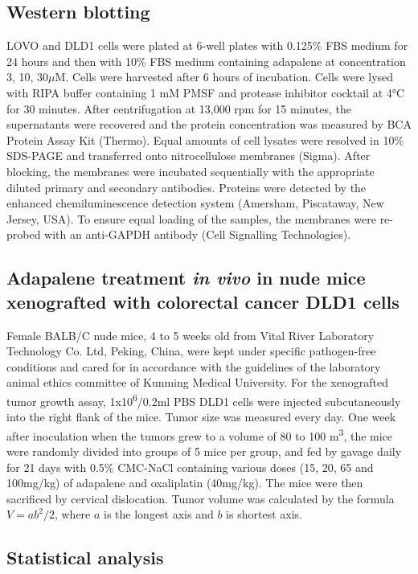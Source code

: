\subsection{Western blotting}

LOVO and DLD1 cells were plated at 6-well plates with 0.125\% FBS medium for 24 hours and then with 10\% FBS medium containing adapalene at concentration 3, 10, 30$\mu$M. Cells were harvested after 6 hours of incubation. Cells were lysed with RIPA buffer containing 1 mM PMSF and protease inhibitor cocktail at 4°C for 30 minutes. After centrifugation at 13,000 rpm for 15 minutes, the supernatants were recovered and the protein concentration was measured by BCA Protein Assay Kit (Thermo). Equal amounts of cell lysates were resolved in 10\% SDS-PAGE and transferred onto nitrocellulose membranes (Sigma). After blocking, the membranes were incubated sequentially with the appropriate diluted primary and secondary antibodies. Proteins were detected by the enhanced chemiluminescence detection system (Amersham, Piscataway, New Jersey, USA). To ensure equal loading of the samples, the membranes were re-probed with an anti-GAPDH antibody (Cell Signalling Technologies).

\subsection{Adapalene treatment \textit{in vivo} in nude mice xenografted with colorectal cancer DLD1 cells}

Female BALB/C nude mice, 4 to 5 weeks old from Vital River Laboratory Technology Co. Ltd, Peking, China, were kept under specific pathogen-free conditions and cared for in accordance with the guidelines of the laboratory animal ethics committee of Kunming Medical University. For the xenografted tumor growth assay, 1x10\textsuperscript{6}/0.2ml PBS DLD1 cells were injected subcutaneously into the right flank of the mice. Tumor size was measured every day. One week after inoculation when the tumors grew to a volume of 80 to 100 m\textsuperscript{3}, the mice were randomly divided into groups of 5 mice per group, and fed by gavage daily for 21 days with 0.5\% CMC-NaCl containing various doses (15, 20, 65 and 100mg/kg) of adapalene and oxaliplatin (40mg/kg). The mice were then sacrificed by cervical dislocation. Tumor volume was calculated by the formula $V=ab^2/2$, where $a$ is the longest axis and $b$ is shortest axis.

\subsection{Statistical analysis}

